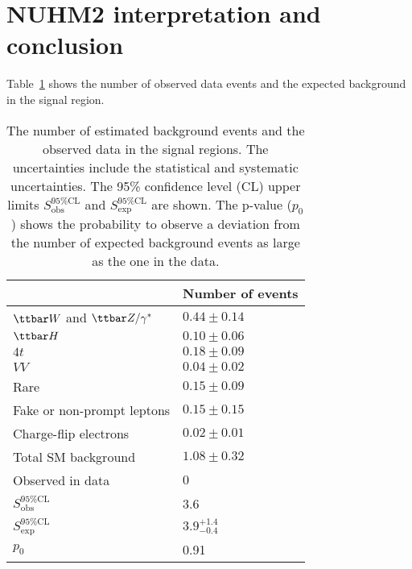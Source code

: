 \section{NUHM2 interpretation and conclusion}
\label{app:ss3l_NUHM2_interpretation_and_conclusion}
Table~\ref{tab:app_ss3l_SR_yields} shows the number of observed data events and the expected background in the signal region.
%
\begin{table}[htbp]
    \begin{center}
        {\footnotesize
            \begin{tabular}{ll}
                \hline
                \hline
                                                     & Number of events\\
                \hline
                $\ttbar W$ and $\ttbar Z/\gamma^{*}$ & $0.44 \pm 0.14$\\
                $\ttbar H$                           & $0.10 \pm 0.06$\\
                $4t$                                 & $0.18 \pm 0.09$\\
                $VV$                                 & $0.04 \pm 0.02$\\
                Rare                                 & $0.15 \pm 0.09$\\
                Fake or non-prompt leptons           & $0.15 \pm 0.15$\\
                Charge-flip electrons                & $0.02 \pm 0.01$\\
                Total SM background                  & $1.08 \pm 0.32$\\
                \hline
                Observed in data                     & $0$\\
                \hline
                $S_\mathrm{obs}^\mathrm{95\%CL}$     & 3.6\\
                $S_\mathrm{exp}^\mathrm{95\%CL}$     & $3.9^{+1.4}_{-0.4}$\\
                $p_{0}$                              & 0.91\\
                \hline
                \hline
            \end{tabular}
        }
    \end{center}
    \caption{The number of estimated background events and the observed data in the signal regions.
    The uncertainties include the statistical and systematic uncertainties.
    The 95\% confidence level (CL) upper limits $S_\mathrm{obs}^\mathrm{95\%CL}$ and $S_\mathrm{exp}^\mathrm{95\%CL}$ are shown.
    The p-value ($p_{0}$) shows the probability to observe a deviation from the number of expected background events as large as the one in the data.}
    \label{tab:app_ss3l_SR_yields}
\end{table}%
